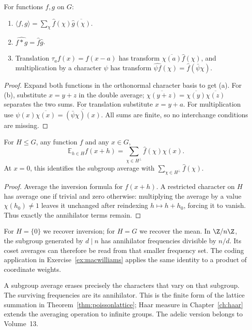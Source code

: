 \begin{proposition}\label{prop:finiteconv}
For functions $f,g$ on $G$:
\begin{enumerate}
\item[(a)] $\langle f,g\rangle=\sum_\chi\hat f(\chi)\overline{\hat g(\chi)}$.
\item[(b)] $\widehat{f*g}=\hat f\hat g$.
\item[(c)] Translation $\tau_af(x)=f(x-a)$ has transform $\overline{\chi(a)}\hat f(\chi)$, and multiplication by a character $\psi$ has transform $\widehat{\psi f}(\chi)=\hat f(\bar\psi\chi)$.
\end{enumerate}
\end{proposition}
\begin{proof}
Expand both functions in the orthonormal character basis to get (a). For (b), substitute $x=y+z$ in the double average; $\overline{\chi(y+z)}=\overline{\chi(y)}\overline{\chi(z)}$ separates the two sums. For translation substitute $x=y+a$. For multiplication use $\psi(x)\overline{\chi(x)}=\overline{(\bar\psi\chi)(x)}$. All sums are finite, so no interchange conditions are missing.
\end{proof}

\begin{theorem}\label{thm:poissonfinite}
For $H\le G$, any function $f$ and any $x\in G$,
\[
\mathbb E_{h\in H}f(x+h)=\sum_{\chi\in H^\perp}\hat f(\chi)\chi(x).
\]
At $x=0$, this identifies the subgroup average with $\sum_{\chi\in H^\perp}\hat f(\chi)$.
\end{theorem}
\begin{proof}
Average the inversion formula for $f(x+h)$. A restricted character on $H$ has average one if trivial and zero otherwise: multiplying the average by a value $\chi(h_0)\ne1$ leaves it unchanged after reindexing $h\mapsto h+h_0$, forcing it to vanish. Thus exactly the annihilator terms remain.
\end{proof}

For $H=\{0\}$ we recover inversion; for $H=G$ we recover the mean. In $\Z/n\Z$, the subgroup generated by $d\mid n$ has annihilator frequencies divisible by $n/d$. Its coset averages can therefore be read from that smaller frequency set. The coding application in Exercise~\ref{ex:macwilliams} applies the same identity to a product of coordinate weights.

\begin{beauty}
A subgroup average erases precisely the characters that vary on that subgroup. The surviving frequencies are its annihilator. This is the finite form of the lattice summation in Theorem~\ref{thm:poissonlattice}; Haar measure in Chapter~\ref{ch:haar} extends the averaging operation to infinite groups. The adelic version belongs to Volume~13.
\end{beauty}

